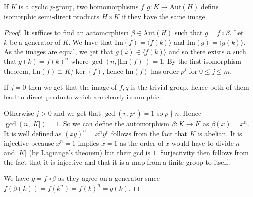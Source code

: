 \begin{lemma}\label{$K$ cyclic $p$-group then equal images define isomorphic semi-direct products}
    If $K$ is a cyclic $p$-group, two homomorphisms $f, g : K \rightarrow \text{Aut}(H)$ define isomorphic semi-direct products $H \rtimes K$ if they have the same image.
\end{lemma}
\begin{proof}
    It suffices to find an automorphism $\beta \in \text{Aut}(H)$ such that $g = f \circ \beta$. Let $k$ be a generator of $K$. We have that $\text{Im}(f) = \langle f(k) \rangle$ and $\text{Im}(g) = \langle g(k) \rangle$. As the images are equal, we get that $g(k) \in \langle f(k) \rangle$ and so there exists $n$ such that $g(k) = f(k)^n$ where $\gcd(n, |\text{Im}(f)|) = 1$. By the first isomorphism theorem, $\text{Im}(f) \cong K / \ker(f)$, hence $\text{Im}(f)$ has order $p^j$ for $0 \leq j \leq m$. 
    
    If $j = 0$ then we get that the image of $f, g$ is the trivial group, hence both of them lead to direct products which are clearly isomorphic. 
    
    Otherwise $j > 0$ and we get that $\gcd(n, p^j) = 1$ so $p \nmid n$. Hence $\gcd(n, |K|) = 1$. So we can define the automorphism $\beta : K \rightarrow K$ as $\beta(x) = x^n$. It is well defined as $(xy)^n = x^n y^n$ follows from the fact that $K$ is abelian. It is injective because $x^n = 1$ implies $x = 1$ as the order of $x$ would have to divide $n$ and $|K|$ (by Lagrange's theorem) but their gcd is $1$. Surjectivity then follows from the fact that it is injective and that it is a map from a finite group to itself.

    We have $g = f \circ \beta$ as they agree on a generator since $f(\beta(k)) = f(k^n) = f(k)^n = g(k)$.
\end{proof}

